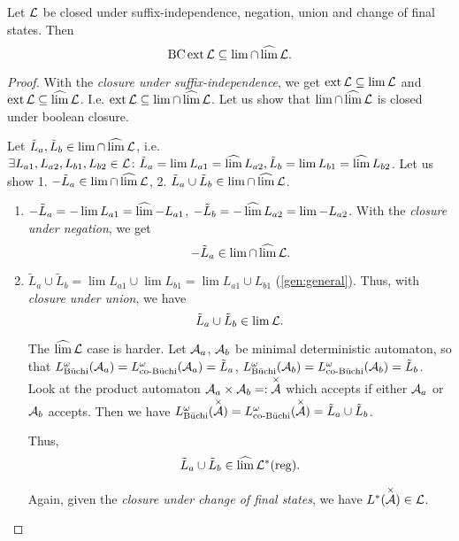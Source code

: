 \begin{theorem}
\label{gen:staiger-wagner:extInLim}
Let $\mathcal{L}$ be closed under suffix-independence, negation, union and change of final states. Then
\[ \operatorname{BC} \operatorname{ext} \mathcal{L} \subseteq \lim \cap \operatorname{\widehat{lim}} \mathcal{L} . \]
\begin{proof}
With the \emph{closure under suffix-independence}, we get $\operatorname{ext} \mathcal{L} \subseteq \lim \mathcal{L}$ and $\operatorname{ext} \mathcal{L} \subseteq \operatorname{\widehat{lim}} \mathcal{L}$. I.e. $\operatorname{ext} \mathcal{L} \subseteq \lim \cap \operatorname{\widehat{lim}} \mathcal{L}$. Let us show that $\lim \cap \operatorname{\widehat{lim}} \mathcal{L}$ is closed under boolean closure.

Let $\tilde L_a,\tilde L_b \in \lim \cap \operatorname{\widehat{lim}} \mathcal{L}$, i.e. $\exists L_{a1}, L_{a2}, L_{b1}, L_{b2} \in \mathcal{L} \colon \tilde L_a = \lim L_{a1} = \operatorname{\widehat{lim}} L_{a2}, \tilde L_b = \lim L_{b1} = \operatorname{\widehat{lim}} L_{b2}$. Let us show 1. $-\tilde L_a \in \lim \cap \operatorname{\widehat{lim}} \mathcal{L}$, 2. $\tilde L_a \cup \tilde L_b \in \lim \cap \operatorname{\widehat{lim}} \mathcal{L}$.
\begin{enumerate}
\item $-\tilde L_a = -\lim L_{a1} = \operatorname{\widehat{lim}} -L_{a1}$, $-\tilde L_b = -\operatorname{\widehat{lim}} L_{a2} = \lim -L_{a2}$. With the \emph{closure under negation}, we get
\[ -\tilde L_a \in \lim \cap \operatorname{\widehat{lim}} \mathcal{L} . \]

\item
$\tilde L_a \cup \tilde L_b = \lim L_{a1} \cup \lim L_{b1} = \lim L_{a1} \cup L_{b1}$ (\cref{gen:general}). Thus, with \emph{closure under union}, we have
\[ \tilde L_a \cup \tilde L_b \in \lim \mathcal{L} . \]

The $\operatorname{\widehat{lim}}\mathcal{L}$ case is harder.
Let $\mathcal{A}_a$, $\mathcal{A}_b$ be minimal deterministic automaton, so that $L^\omega_{\text{Büchi}}(\mathcal{A}_a) = L^\omega_{\text{co-Büchi}}(\mathcal{A}_a) = \tilde L_a$, $L^\omega_{\text{Büchi}}(\mathcal{A}_b) = L^\omega_{\text{co-Büchi}}(\mathcal{A}_b) = \tilde L_b$. Look at the product automaton $\mathcal{A}_a \times \mathcal{A}_b =: \overset{\times}{\mathcal{A}}$ which accepts if either $\mathcal{A}_a$ or $\mathcal{A}_b$ accepts.
Then we have $L^\omega_{\text{Büchi}}(\overset{\times}{\mathcal{A}}) = L^\omega_{\text{co-Büchi}}(\overset{\times}{\mathcal{A}}) = \tilde L_a \cup \tilde L_b$.

Thus,
\[ \tilde L_a \cup \tilde L_b \in \operatorname{\widehat{lim}} \mathcal{L}^*(\textup{\textrm{reg}}) . \]


Again, given the \emph{closure under change of final states}, we have $L^*(\overset{\times}{\mathcal{A}}) \in \mathcal{L}$.
\end{enumerate}
\end{proof}
\end{theorem}

